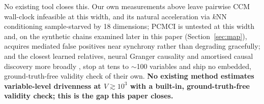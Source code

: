\documentclass[11pt]{article}
\begin{document}
No existing tool closes this. Our own measurements above leave pairwise CCM
wall-clock infeasible at this width, and its natural acceleration via
$k$NN conditioning \citep{kraskov2004} sample-starved by 18 dimensions;
PCMCI \citep{runge2019} is untested at this width and, on the synthetic
chains examined later in this paper (Section~\ref{sec:map}), acquires
mediated false positives near synchrony rather than degrading gracefully;
and the closest learned relatives, neural Granger causality
\citep{tank2021} and amortised causal discovery more broadly
\citep{lowe2022}, stop at tens to $\sim$100 variables and ship no
embedded, ground-truth-free validity check of their own. \textbf{No
existing method estimates variable-level drivenness at $V \gtrsim 10^3$
with a built-in, ground-truth-free validity check; this is the gap this
paper closes.}
\end{document}
